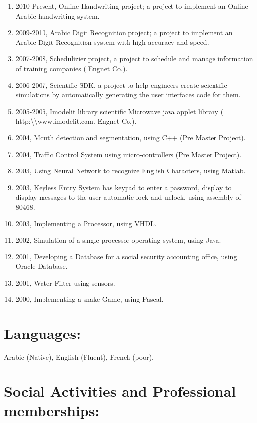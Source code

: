 \documentclass{article}
\begin{document}
 \begin{enumerate}
\item 2010-Present, Online Handwriting project; a project to implement an Online Arabic handwriting system.
 \item 2009-2010, Arabic Digit Recognition project; a project to implement an Arabic Digit Recognition system with high accuracy and speed.
\item 2007-2008, Schedulizier project, a project to schedule and manage information of training companies ( Engnet Co.).
 \item 2006-2007, Scientific SDK, a project to help engineers create scientific simulations by automatically generating the user interfaces code for them.
 \item 2005-2006, Imodelit library scientific Microwave java applet library ( http:\textbackslash \textbackslash www.imodelit.com. Engnet Co.).
 \item 2004, Mouth detection and segmentation, using C++ (Pre Master Project).
 \item 2004, Traffic Control System using micro-controllers (Pre Master
 Project).
 \item 2003, Using Neural Network to recognize English Characters, using Matlab.
 \item 2003, Keyless Entry System has keypad to enter a password, display to display messages to the user automatic lock and unlock, using assembly of 80468.
 \item 2003, Implementing a Processor, using VHDL.
 \item 2002, Simulation of a single processor operating system, using Java.
 \item 2001, Developing a Database for a social security accounting office, using Oracle Database.
 \item 2001, Water Filter using sensors.
 \item 2000, Implementing a snake Game, using Pascal.
\end{enumerate}



 \section*{Languages:}

Arabic (Native), English (Fluent), French (poor).


 \section*{Social Activities and Professional memberships:}
\end{document}
